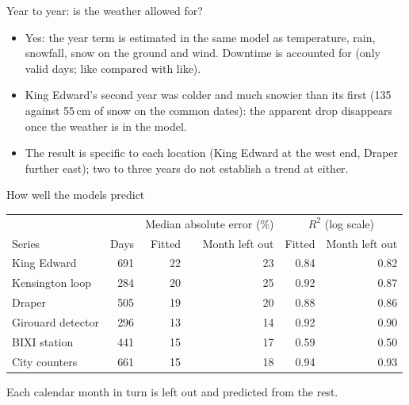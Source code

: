 \documentclass[aspectratio=169,10pt]{beamer}\usetheme{default}\usecolortheme{seahorse}\setbeamertemplate{navigation symbols}{}\setbeamertemplate{footline}[frame number]
\begin{document}
\begin{frame}{Year to year: is the weather allowed for?}
\begin{itemize}
\item Yes: the year term is estimated in the same model as temperature, rain, snowfall, snow on the ground and wind. Downtime is accounted for (only valid days; like compared with like).
\end{itemize}
\begin{center}\end{center}
\begin{itemize}
\item King Edward\textquoteright{}s second year was colder and much snowier than its first (135 against 55\,cm of snow on the common dates): the apparent drop disappears once the weather is in the model.
\item The result is specific to each location (King Edward at the west end, Draper further east); two to three years do not establish a trend at either.
\end{itemize}
\end{frame}
\begin{frame}{How well the models predict}
\begin{center}\small\begin{tabular}{lrrrrr}\toprule
 & & \multicolumn{2}{c}{Median absolute error (\%)} & \multicolumn{2}{c}{$R^2$ (log scale)}\\
Series & Days & Fitted & Month left out & Fitted & Month left out\\\midrule
King Edward & 691 & 22 & 23 & 0.84 & 0.82 \\
Kensington loop & 284 & 20 & 25 & 0.92 & 0.87 \\
Draper & 505 & 19 & 20 & 0.88 & 0.86 \\
Girouard detector & 296 & 13 & 14 & 0.92 & 0.90 \\
BIXI station & 441 & 15 & 17 & 0.59 & 0.50 \\
City counters & 661 & 15 & 18 & 0.94 & 0.93 \\
\bottomrule\end{tabular}\end{center}
Each calendar month in turn is left out and predicted from the rest.
\end{frame}
\end{document}
